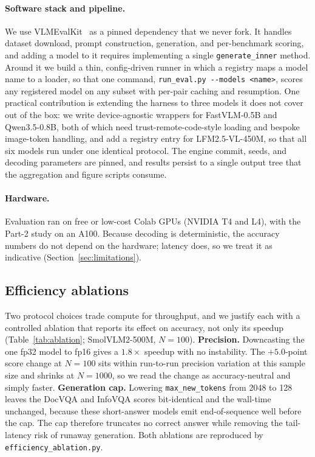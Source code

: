 \documentclass{article}
\begin{document}
\paragraph{Software stack and pipeline.}
We use VLMEvalKit~\citep{duan2024vlmevalkit} as a pinned dependency that we never
fork. It handles dataset download, prompt construction, generation, and
per-benchmark scoring, and adding a model to it requires implementing a single
\texttt{generate\_inner} method. Around it we build a thin, config-driven runner
in which a registry maps a model name to a loader, so that one command,
\texttt{run\_eval.py -{}-models <name>}, scores any registered model on any
subset with per-pair caching and resumption. One practical contribution is
extending the harness to three models it does not cover out of the box: we write
device-agnostic wrappers for FastVLM-0.5B and Qwen3.5-0.8B, both of which need
trust-remote-code-style loading and bespoke image-token handling, and add a
registry entry for LFM2.5-VL-450M, so that all six models run under one identical
protocol. The engine commit, seeds, and decoding parameters are pinned, and
results persist to a single output tree that the aggregation and figure scripts
consume.

\paragraph{Hardware.}
Evaluation ran on free or low-cost Colab GPUs (NVIDIA T4 and L4), with the Part-2
study on an A100. Because decoding is deterministic, the accuracy numbers do not
depend on the hardware; latency does, so we treat it as indicative
(Section~\ref{sec:limitations}).

\subsection{Efficiency ablations}
\label{sec:efficiency}
Two protocol choices trade compute for throughput, and we justify each with a
controlled ablation that reports its effect on accuracy, not only its speedup
(Table~\ref{tab:ablation}; SmolVLM2-500M, $N{=}100$). \textbf{Precision.}
Downcasting the one fp32 model to fp16 gives a $1.8\times$ speedup with no
instability. The $+5.0$-point score change at $N{=}100$ sits within run-to-run
precision variation at this sample size and shrinks at $N{=}1000$, so we read the
change as accuracy-neutral and simply faster. \textbf{Generation cap.} Lowering
\texttt{max\_new\_tokens} from 2048 to 128 leaves the DocVQA and InfoVQA scores
bit-identical and the wall-time unchanged, because these short-answer models emit
end-of-sequence well before the cap. The cap therefore truncates no correct
answer while removing the tail-latency risk of runaway generation. Both ablations
are reproduced by \texttt{efficiency\_ablation.py}.
\end{document}
